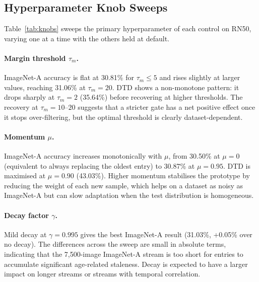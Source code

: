 \documentclass[10pt,twocolumn,letterpaper]{article}
\begin{document}
\subsection{Hyperparameter Knob Sweeps}
\label{subsec:ablations}

Table~\ref{tab:knobs} sweeps the primary hyperparameter of each
control on RN50, varying one at a time with the others held at default.

\paragraph{Margin threshold $\tau_m$.}
ImageNet-A accuracy is flat at 30.81\% for $\tau_m \leq 5$ and
rises slightly at larger values, reaching 31.06\% at $\tau_m{=}20$.
DTD shows a non-monotone pattern: it drops sharply at
$\tau_m{=}2$ (35.64\%) before recovering at higher thresholds.
The recovery at $\tau_m{=}10$--$20$ suggests that a stricter gate
has a net positive effect once it stops over-filtering, but the
optimal threshold is clearly dataset-dependent.

\paragraph{Momentum $\mu$.}
ImageNet-A accuracy increases monotonically with $\mu$, from 30.50\%
at $\mu{=}0$ (equivalent to always replacing the oldest entry) to
30.87\% at $\mu{=}0.95$.
DTD is maximised at $\mu{=}0.90$ (43.03\%).
Higher momentum stabilises the prototype by reducing the weight of
each new sample, which helps on a dataset as noisy as ImageNet-A
but can slow adaptation when the test distribution is homogeneous.

\paragraph{Decay factor $\gamma$.}
Mild decay at $\gamma{=}0.995$ gives the best ImageNet-A result
(31.03\%, +0.05\% over no decay).
The differences across the sweep are small in absolute terms,
indicating that the 7,500-image ImageNet-A stream is too short for
entries to accumulate significant age-related staleness.
Decay is expected to have a larger impact on longer streams or
streams with temporal correlation.
\end{document}
